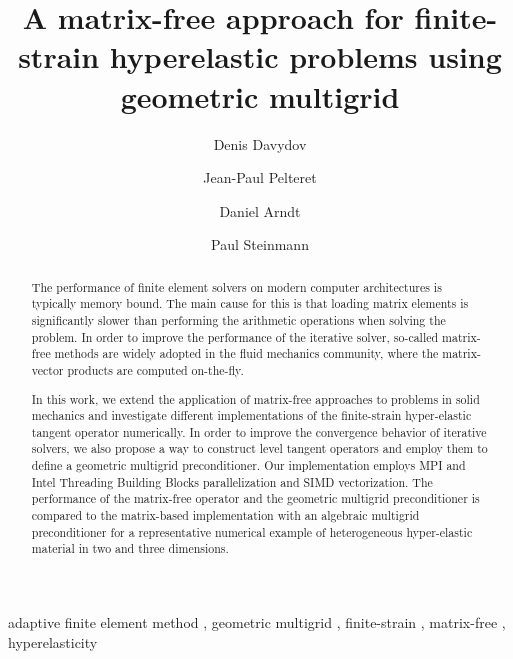 \documentclass[preprint,12pt,times]{elsarticle}
\begin{document}
\begin{frontmatter}
  \title{
  A matrix-free approach for finite-strain hyperelastic problems using geometric multigrid
  }

  \author[a]{Denis Davydov}

  \author[a]{Jean-Paul Pelteret}

  \author[b]{Daniel Arndt}

  \author[a]{Paul Steinmann}


  \address[a]{Chair of Applied Mechanics,
  Friedrich-Alexander-Universit\"{a}t Erlangen-N\"{u}rnberg,
  Egerlandstr.\ 5, 91058 Erlangen, Germany}

  \address[b]{Interdisciplinary Center for Scientific Computing (IWR),
      Heidelberg University,
      Im Neuenheimer Feld 205,
      69120 Heidelberg,
      Germany}


  \begin{abstract}
    The performance of finite element solvers on modern computer architectures is typically memory bound.
    The main cause for this is that loading matrix elements is significantly slower than performing the arithmetic operations when solving the problem.
    In order to improve the performance of the iterative solver, so-called matrix-free methods are
    widely adopted in the fluid mechanics community, where the matrix-vector products are computed on-the-fly.

    In this work, we extend the application of matrix-free approaches to problems in solid mechanics and investigate different implementations of the finite-strain hyper-elastic tangent operator numerically.
    In order to improve the convergence behavior of iterative solvers, we also propose a way to construct level tangent operators
    and employ them to define a geometric multigrid preconditioner.
    Our implementation employs MPI {\color{red}and Intel Threading Building Blocks parallelization} and SIMD vectorization.
    The performance of the matrix-free operator and the geometric multigrid preconditioner is compared to the matrix-based implementation with an algebraic multigrid preconditioner for a representative numerical example of heterogeneous hyper-elastic material in two and three dimensions.
  \end{abstract}


  \begin{keyword}
      adaptive finite element method \sep
      geometric multigrid \sep
      finite-strain \sep
      matrix-free \sep
      hyperelasticity
  \end{keyword}

  \end{frontmatter}
\end{document}
